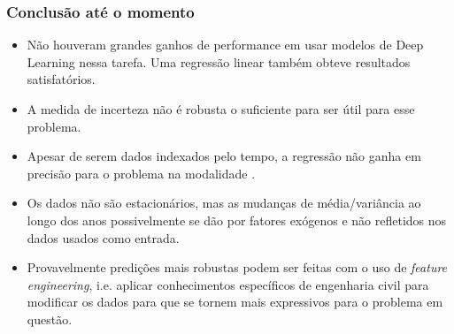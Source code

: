 \documentclass{beamer}
\begin{document}
\begin{frame}
  \frametitle{Conclusão até o momento}
  \begin{itemize}
    \item Não houveram grandes ganhos de performance em usar modelos de Deep
      Learning nessa tarefa. Uma regressão linear também obteve
      resultados satisfatórios.
    \item A medida de incerteza não é robusta o suficiente para ser útil para
      esse problema.
      \item Apesar de serem dados indexados pelo tempo, a regressão não ganha em
        precisão para o problema na modalidade . 
      \item Os dados não são estacionários, mas as mudanças de média/variância
        ao longo dos anos possivelmente se dão por fatores exógenos e não
        refletidos nos dados usados como entrada.
      \item Provavelmente predições mais robustas podem ser feitas com o uso de
        \textit{feature engineering}, i.e. aplicar conhecimentos específicos de
        engenharia civil para modificar os dados para que se tornem mais
        expressivos para o problema em questão.
      \end{itemize} 
      
\end{frame}
\end{document}
